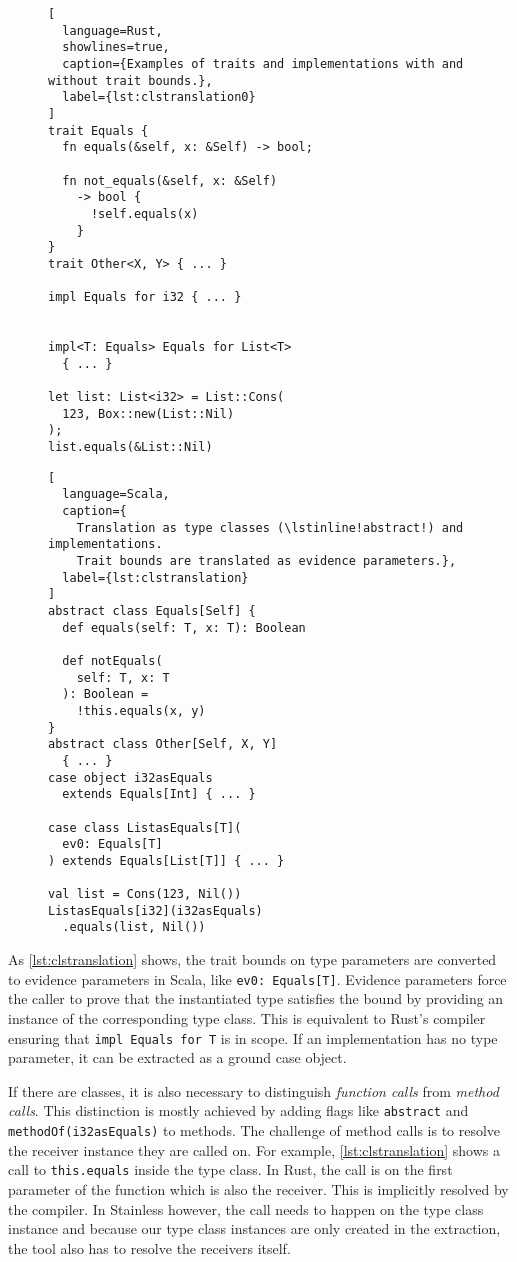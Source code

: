 \begin{figure}
\begin{minipage}[t]{.49\textwidth}
\begin{lstlisting}[
  language=Rust,
  showlines=true,
  caption={Examples of traits and implementations with and without trait bounds.},
  label={lst:clstranslation0}
]
trait Equals {
  fn equals(&self, x: &Self) -> bool;

  fn not_equals(&self, x: &Self)
    -> bool {
      !self.equals(x)
    }
}
trait Other<X, Y> { ... }

impl Equals for i32 { ... }


impl<T: Equals> Equals for List<T>
  { ... }

let list: List<i32> = List::Cons(
  123, Box::new(List::Nil)
);
list.equals(&List::Nil)
\end{lstlisting}
\end{minipage}\hfill
\begin{minipage}[t]{.49\textwidth}
\begin{lstlisting}[
  language=Scala,
  caption={
    Translation as type classes (\lstinline!abstract!) and implementations.
    Trait bounds are translated as evidence parameters.},
  label={lst:clstranslation}
]
abstract class Equals[Self] {
  def equals(self: T, x: T): Boolean

  def notEquals(
    self: T, x: T
  ): Boolean =
    !this.equals(x, y)
}
abstract class Other[Self, X, Y]
  { ... }
case object i32asEquals
  extends Equals[Int] { ... }

case class ListasEquals[T](
  ev0: Equals[T]
) extends Equals[List[T]] { ... }

val list = Cons(123, Nil())
ListasEquals[i32](i32asEquals)
  .equals(list, Nil())
\end{lstlisting}
\end{minipage}
\end{figure}

As \autoref{lst:clstranslation} shows, the trait bounds on type parameters are
converted to evidence parameters in Scala, like \passthrough{\lstinline!ev0:
Equals[T]!}. Evidence parameters force the caller to prove that the instantiated
type satisfies the bound by providing an instance of the corresponding type
class. This is equivalent to Rust's compiler ensuring that
\passthrough{\lstinline!impl Equals for T!} is in scope. If an implementation
has no type parameter, it can be extracted as a ground case object.

If there are classes, it is also necessary to distinguish \emph{function calls}
from \emph{method calls}. This distinction is mostly achieved by adding flags
like \passthrough{\lstinline!abstract!} and
\passthrough{\lstinline!methodOf(i32asEquals)!} to methods. The challenge of
method calls is to resolve the receiver instance they are called on. For
example, \autoref{lst:clstranslation} shows a call to \lstinline!this.equals!
inside the type class. In Rust, the call is on the first parameter of the
function which is also the receiver. This is implicitly resolved by the
compiler. In Stainless however, the call needs to happen on the type class
instance and because our type class instances are only created in the
extraction, the tool also has to resolve the receivers itself.

